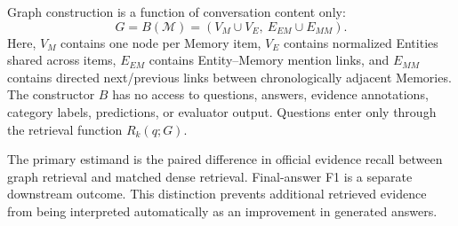 \documentclass[a4paper,twoside]{article}
\begin{document}
Graph construction is a function of conversation content only:
\begin{equation}
G=B(\mathcal{M})=(V_M\cup V_E,\ E_{EM}\cup E_{MM}).
\label{eq:graph}
\end{equation}
Here, \(V_M\) contains one node per Memory item, \(V_E\) contains normalized
Entities shared across items, \(E_{EM}\) contains Entity--Memory mention
links, and \(E_{MM}\) contains directed next/previous links between
chronologically adjacent Memories. The constructor \(B\) has no access to
questions, answers, evidence annotations, category labels, predictions, or
evaluator output. Questions enter only through the retrieval function
\(R_k(q;G)\).

The primary estimand is the paired difference in official evidence recall
between graph retrieval and matched dense retrieval. Final-answer F1 is a
separate downstream outcome. This distinction prevents additional retrieved
evidence from being interpreted automatically as an improvement in generated
answers.
\end{document}

